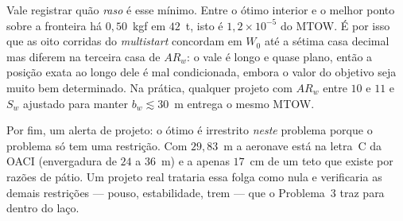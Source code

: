 Vale registrar quão \emph{raso} é esse mínimo. Entre o ótimo interior e
o melhor ponto sobre a fronteira há $0{,}50$~kgf em $42$~t, isto é
$1{,}2\times 10^{-5}$ do MTOW. É por isso que as oito corridas do
\emph{multistart} concordam em $W_0$ até a sétima casa decimal mas
diferem na terceira casa de $AR_w$: o vale é longo e quase plano, então
a posição exata ao longo dele é mal condicionada, embora o valor do
objetivo seja muito bem determinado. Na prática, qualquer projeto com
$AR_w$ entre $10$ e $11$ e $S_w$ ajustado para manter $b_w \lesssim 30$~m
entrega o mesmo MTOW.

Por fim, um alerta de projeto: o ótimo é irrestrito \emph{neste} problema
porque o problema só tem uma restrição. Com $29{,}83$~m a aeronave está
na letra~C da OACI (envergadura de $24$ a $36$~m) e a apenas $17$~cm de
um teto que existe por razões de pátio. Um projeto real trataria essa
folga como nula e verificaria as demais restrições --- pouso,
estabilidade, trem --- que o Problema~3 traz para dentro do laço.
